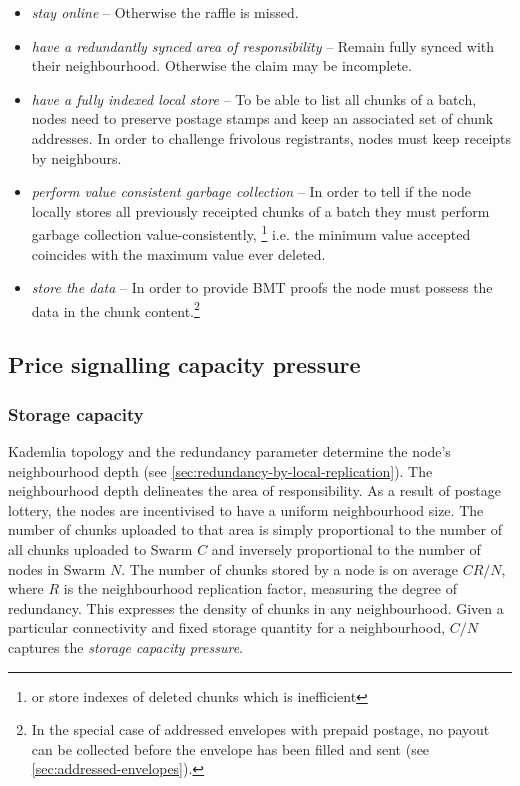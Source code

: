 \begin{itemize}
\item \emph{stay online} -- Otherwise the raffle is missed.
\item \emph{have a redundantly synced area of responsibility} -- Remain fully synced with their neighbourhood. Otherwise the claim may be incomplete.
\item \emph{have a fully indexed local store} -- To be able to list all chunks of a batch, nodes need to preserve postage stamps and keep an associated set of chunk addresses. In order to challenge frivolous registrants, nodes must keep receipts by neighbours.
\item \emph{perform value consistent garbage collection} -- In order to tell if the node locally stores all previously receipted chunks of a batch they must perform garbage collection value-consistently,%
%
\footnote{or store indexes of deleted chunks which is inefficient}
i.e. the minimum value accepted coincides with the maximum value ever deleted.
%
\item \emph{store the data} -- In order to provide BMT proofs the node must possess the data in the chunk content.\footnote{In the special case of addressed envelopes with prepaid postage, no payout can be collected before the envelope has been filled and sent (see \ref{sec:addressed-envelopes}).}
\end{itemize}



\subsection{Price signalling capacity pressure \statusyellow}\label{sec:capacity-pressure}

\yellow{}

\subsubsection{Storage capacity}
Kademlia topology and the redundancy parameter determine the node's neighbourhood depth (see \ref{sec:redundancy-by-local-replication}). The neighbourhood depth delineates the area of responsibility. As a result of postage lottery, the nodes are incentivised to have a uniform neighbourhood size. The number of chunks uploaded to that area is simply proportional to the number of all chunks uploaded to Swarm $C$ and inversely proportional to the number of nodes in Swarm $N$. The number of chunks stored by a node is on average $CR/N$, where $R$ is the neighbourhood replication factor, measuring the degree of redundancy. This expresses the density of chunks in any neighbourhood. Given a particular connectivity and fixed storage quantity for a neighbourhood, $C/N$ captures the \emph{storage capacity pressure}. 


